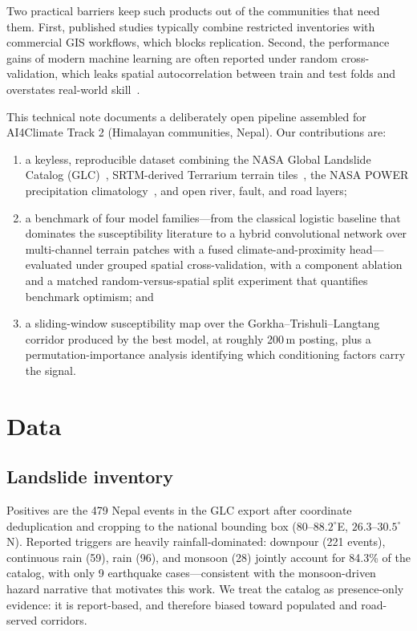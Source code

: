 \documentclass[11pt,a4paper]{article}
\begin{document}
Two practical barriers keep such products out of the communities that need
them. First, published studies typically combine restricted inventories with
commercial GIS workflows, which blocks replication. Second, the performance
gains of modern machine learning are often reported under random
cross-validation, which leaks spatial autocorrelation between train and test
folds and overstates real-world skill~\cite{roberts2017}.

This technical note documents a deliberately open pipeline assembled for
AI4Climate Track 2 (Himalayan communities, Nepal). Our contributions are:
\begin{enumerate}[itemsep=2pt, topsep=4pt]
  \item a keyless, reproducible dataset combining the NASA Global Landslide
        Catalog (GLC)~\cite{kirschbaum2009}, SRTM-derived Terrarium terrain
        tiles~\cite{terrarium}, the NASA POWER precipitation
        climatology~\cite{power}, and open river, fault, and road layers;
  \item a benchmark of four model families---from the classical logistic
        baseline that dominates the susceptibility literature to a hybrid
        convolutional network over multi-channel terrain patches with a fused
        climate-and-proximity head---evaluated under grouped spatial
        cross-validation, with a component ablation and a matched
        random-versus-spatial split experiment that quantifies benchmark
        optimism; and
  \item a sliding-window susceptibility map over the Gorkha--Trishuli--Langtang
        corridor produced by the best model, at roughly 200\,m posting, plus a
        permutation-importance analysis identifying which conditioning factors
        carry the signal.
\end{enumerate}

\section{Data}
\label{sec:data}

\subsection{Landslide inventory}
Positives are the 479 Nepal events in the GLC export after coordinate
deduplication and cropping to the national bounding box
($80$--$88.2^\circ$E, $26.3$--$30.5^\circ$N). Reported triggers are heavily
rainfall-dominated: downpour (221 events), continuous rain (59), rain (96), and
monsoon (28) jointly account for 84.3\% of the catalog, with only 9 earthquake
cases---consistent with the monsoon-driven hazard narrative that motivates this
work. We treat the catalog as presence-only evidence: it is report-based, and
therefore biased toward populated and road-served corridors.
\end{document}

